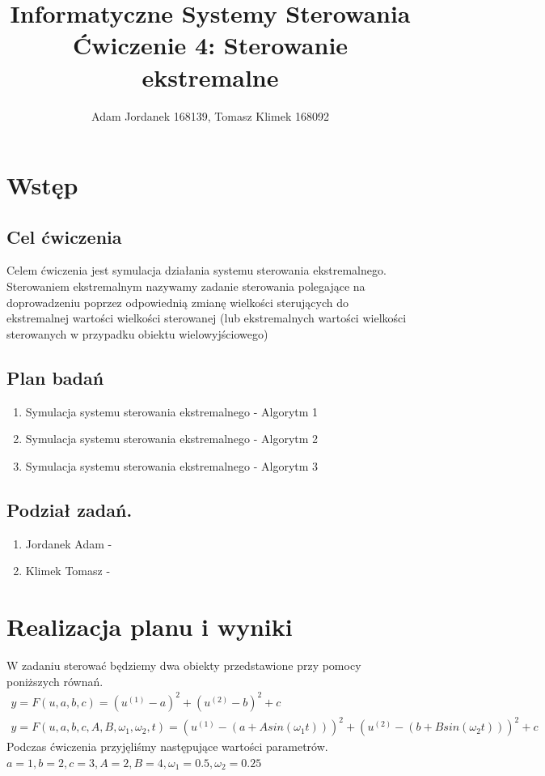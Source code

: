\documentclass[a4paper,10pt]{article}
\title{Informatyczne Systemy Sterowania \\ \large Ćwiczenie 4: Sterowanie ekstremalne}
\author{Adam Jordanek 168139, Tomasz Klimek 168092}
\begin{document}
\maketitle

\section{Wstęp}\label{sec:wstęp}
\subsection{Cel ćwiczenia}
Celem  ćwiczenia jest symulacja działania systemu sterowania ekstremalnego. Sterowaniem 
ekstremalnym nazywamy zadanie sterowania polegające na doprowadzeniu poprzez odpowiednią
zmianę wielkości sterujących do ekstremalnej wartości wielkości sterowanej (lub ekstremalnych 
wartości wielkości sterowanych w przypadku obiektu wielowyjściowego)

\subsection{Plan badań} 
\begin{enumerate}
	\item Symulacja systemu sterowania ekstremalnego - Algorytm 1
	
	\item Symulacja systemu sterowania ekstremalnego - Algorytm 2
	
	\item Symulacja systemu sterowania ekstremalnego - Algorytm 3
	
\end{enumerate}

\subsection{Podział zadań. } 
\begin{enumerate}
		\item Jordanek Adam - 
		\item Klimek Tomasz -
\end{enumerate}

\newpage
\section{Realizacja planu i wyniki}
W zadaniu sterować będziemy dwa obiekty przedstawione przy pomocy poniższych równań.
\begin{eqnarray}
	y = F(u, a, b, c) = (u^{(1)} - a)^2 + (u^{(2)} - b)^2 + c\\
	y = F(u, a, b, c, A, B, \omega_1, \omega_2, t) = (u^{(1)} - (a + Asin(\omega_1t)))^2 + (u^{(2)} - (b + Bsin(\omega_2t)))^2 + c
\end{eqnarray}
Podczas ćwiczenia przyjęliśmy następujące wartości parametrów. \\
$a=1, b=2, c=3, A=2, B=4, \omega_1=0.5, \omega_2=0.25$
\end{document}
